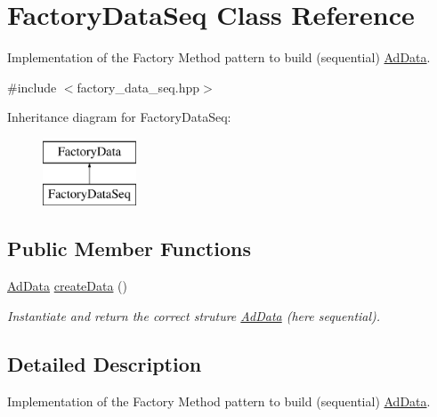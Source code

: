 \hypertarget{classFactoryDataSeq}{\section{\-Factory\-Data\-Seq \-Class \-Reference}
\label{classFactoryDataSeq}
}


\-Implementation of the \-Factory \-Method pattern to build (sequential) \hyperlink{classAdData}{\-Ad\-Data}.  




{\ttfamily \#include $<$factory\-\_\-data\-\_\-seq.\-hpp$>$}

\-Inheritance diagram for \-Factory\-Data\-Seq\-:\begin{figure}[H]
\begin{center}
\leavevmode
\includegraphics[height=2.000000cm]{classFactoryDataSeq}
\end{center}
\end{figure}
\subsection*{\-Public \-Member \-Functions}
\begin{DoxyCompactItemize}
\item 
\hyperlink{classAdData}{\-Ad\-Data} \hyperlink{classFactoryDataSeq_ac229b96239d9041f856fe63dcfc6c24f}{create\-Data} ()
\begin{DoxyCompactList}\small\item\em \-Instantiate and return the correct struture \hyperlink{classAdData}{\-Ad\-Data} (here sequential). \end{DoxyCompactList}\end{DoxyCompactItemize}


\subsection{\-Detailed \-Description}
\-Implementation of the \-Factory \-Method pattern to build (sequential) \hyperlink{classAdData}{\-Ad\-Data}. 

